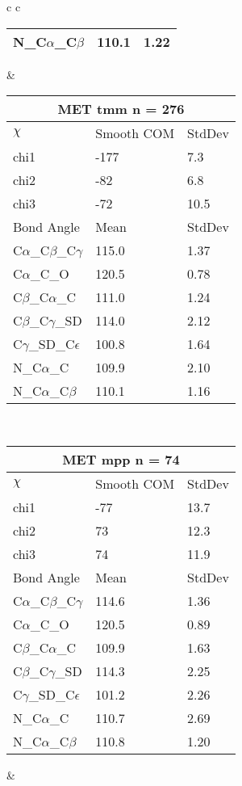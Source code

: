 \begin{longtable}{ c c }
\begin{tabular}{ l l l }
  N\_C$\alpha$\_C$\beta$ & 110.1 & 1.22\\
  \bottomrule
  \end{tabular}
  &
  \begin{tabular}{ l l l }
  \toprule
  \multicolumn{3}{c}{MET \textbf{tmm} n = 276} \\ \toprule
  $\chi$       & Smooth COM & StdDev \\ \midrule
  chi1 & -177 & 7.3 \\ 
  chi2 & -82 & 6.8 \\ 
  chi3 & -72 & 10.5 \\ \midrule
  Bond Angle   & Mean     & StdDev \\ \midrule
  C$\alpha$\_C$\beta$\_C$\gamma$ & 115.0 & 1.37\\
  C$\alpha$\_C\_O & 120.5 & 0.78\\
  C$\beta$\_C$\alpha$\_C & 111.0 & 1.24\\
  C$\beta$\_C$\gamma$\_SD & 114.0 & 2.12\\
  C$\gamma$\_SD\_C$\epsilon$ & 100.8 & 1.64\\
  N\_C$\alpha$\_C & 109.9 & 2.10\\
  N\_C$\alpha$\_C$\beta$ & 110.1 & 1.16\\
  \bottomrule
  \end{tabular}
  \\
  \begin{tabular}{ l l l }
  \toprule
  \multicolumn{3}{c}{MET \textbf{mpp} n = 74} \\ \toprule
  $\chi$       & Smooth COM & StdDev \\ \midrule
  chi1 & -77 & 13.7 \\ 
  chi2 & 73 & 12.3 \\ 
  chi3 & 74 & 11.9 \\ \midrule
  Bond Angle   & Mean     & StdDev \\ \midrule
  C$\alpha$\_C$\beta$\_C$\gamma$ & 114.6 & 1.36\\
  C$\alpha$\_C\_O & 120.5 & 0.89\\
  C$\beta$\_C$\alpha$\_C & 109.9 & 1.63\\
  C$\beta$\_C$\gamma$\_SD & 114.3 & 2.25\\
  C$\gamma$\_SD\_C$\epsilon$ & 101.2 & 2.26\\
  N\_C$\alpha$\_C & 110.7 & 2.69\\
  N\_C$\alpha$\_C$\beta$ & 110.8 & 1.20\\
  \bottomrule
  \end{tabular}
  &
  \begin{tabular}{ l l l }

\end{tabular}
\end{longtable}
